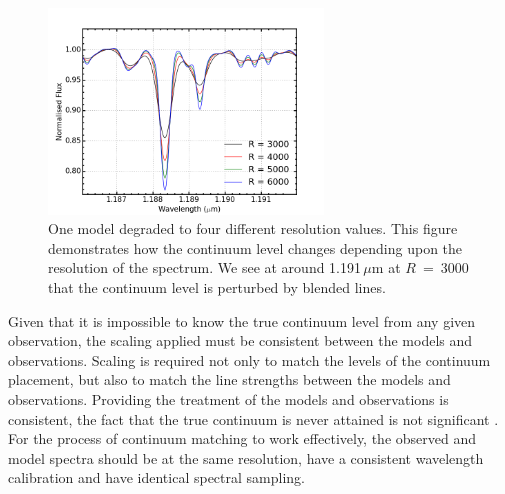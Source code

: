 \begin{figure}
 \centering
\includegraphics[width=0.65\textwidth]{JAnal/Resolution}
\caption[An example of the effect of the spectral resolution on the appearance of the model gird spectra]{
One model degraded to four different resolution values.
This figure demonstrates how the continuum level changes depending upon
the resolution of the spectrum.
We see at around 1.191\,$\mu$m at $R$~=~3000 that the continuum level is perturbed by blended lines.\label{fig:mod-res}
         }
\end{figure}



Given that it is impossible to know the true continuum level from any given observation,
the scaling applied must be consistent between the models and observations.
Scaling is required not only to match the levels of the continuum placement, but also to match the line strengths between the models and observations.
Providing the treatment of the models and observations is consistent, the fact that the true continuum is never attained is not significant
\citep{2014ApJ...788...58G}.
For the process of continuum matching to work effectively,
the observed and model spectra should be at the same resolution,
have a consistent wavelength calibration and have identical spectral sampling.

